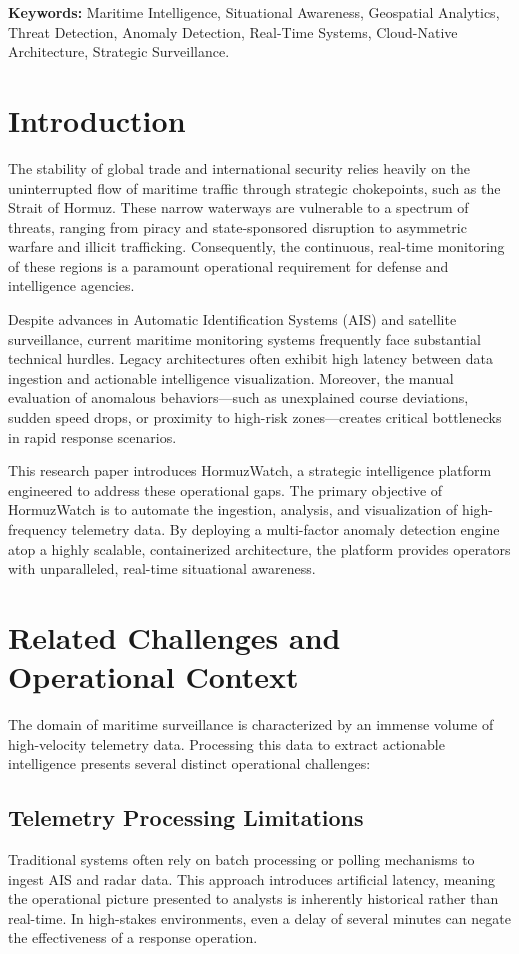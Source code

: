 \documentclass[11pt,a4paper]{article}
\begin{document}
\textbf{Keywords:} Maritime Intelligence, Situational Awareness, Geospatial Analytics, Threat Detection, Anomaly Detection, Real-Time Systems, Cloud-Native Architecture, Strategic Surveillance.

\newpage

\section{Introduction}
The stability of global trade and international security relies heavily on the uninterrupted flow of maritime traffic through strategic chokepoints, such as the Strait of Hormuz. These narrow waterways are vulnerable to a spectrum of threats, ranging from piracy and state-sponsored disruption to asymmetric warfare and illicit trafficking. Consequently, the continuous, real-time monitoring of these regions is a paramount operational requirement for defense and intelligence agencies. 

Despite advances in Automatic Identification Systems (AIS) and satellite surveillance, current maritime monitoring systems frequently face substantial technical hurdles. Legacy architectures often exhibit high latency between data ingestion and actionable intelligence visualization. Moreover, the manual evaluation of anomalous behaviors—such as unexplained course deviations, sudden speed drops, or proximity to high-risk zones—creates critical bottlenecks in rapid response scenarios.

This research paper introduces HormuzWatch, a strategic intelligence platform engineered to address these operational gaps. The primary objective of HormuzWatch is to automate the ingestion, analysis, and visualization of high-frequency telemetry data. By deploying a multi-factor anomaly detection engine atop a highly scalable, containerized architecture, the platform provides operators with unparalleled, real-time situational awareness.

\section{Related Challenges and Operational Context}
The domain of maritime surveillance is characterized by an immense volume of high-velocity telemetry data. Processing this data to extract actionable intelligence presents several distinct operational challenges:

\subsection{Telemetry Processing Limitations}
Traditional systems often rely on batch processing or polling mechanisms to ingest AIS and radar data. This approach introduces artificial latency, meaning the operational picture presented to analysts is inherently historical rather than real-time. In high-stakes environments, even a delay of several minutes can negate the effectiveness of a response operation.
\end{document}

